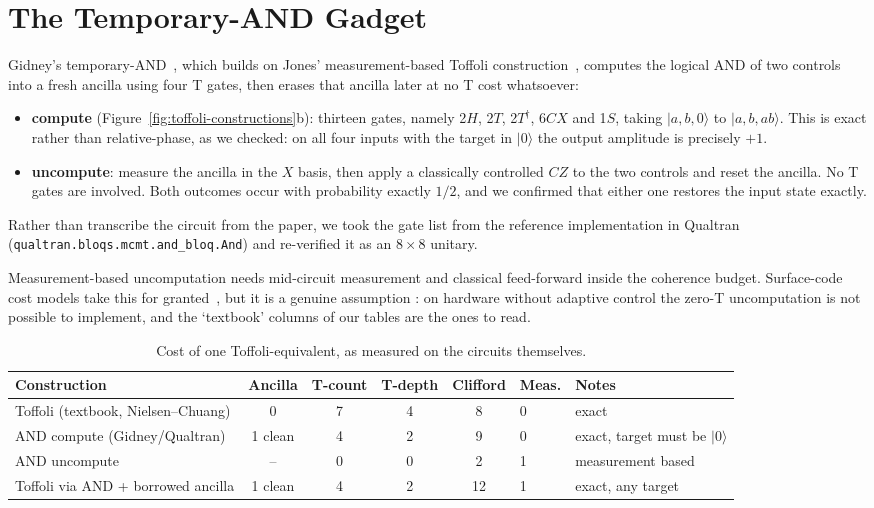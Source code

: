 \documentclass[runningheads,10pt]{llncs}
\begin{document}
\section{The Temporary-AND Gadget}
\label{sec:temp-and}

Gidney's temporary-AND~\cite{gidney2018halving}, which builds on Jones' measurement-based Toffoli construction~\cite{jones2013lowoverhead}, computes the logical AND of two controls into a fresh ancilla using four T gates, then erases that ancilla later at no T cost whatsoever:

\begin{itemize}
\item \textbf{compute} (Figure~\ref{fig:toffoli-constructions}b): thirteen gates, namely 2$H$, 2$T$, 2$T^\dagger$, 6$CX$ and 1$S$, taking $|a,b,0\rangle$ to $|a,b,ab\rangle$. This is exact rather than relative-phase, as we checked: on all four inputs with the target in $|0\rangle$ the output amplitude is precisely $+1$.
\item \textbf{uncompute}: measure the ancilla in the $X$ basis, then apply a classically controlled $CZ$ to the two controls and reset the ancilla. No T gates are involved. Both outcomes occur with probability exactly $1/2$, and we confirmed that either one restores the input state exactly.
\end{itemize}

Rather than transcribe the circuit from the paper, we took the gate list from the reference implementation in Qualtran~\cite{harrigan2024expressing} (\texttt{qualtran.bloqs.mcmt.and\_bloq.And}) and re-verified it as an $8\times8$ unitary.

\begin{remark}
Measurement-based uncomputation needs mid-circuit measurement and classical feed-forward inside the coherence budget. Surface-code cost models take this for granted~\cite{gidney2018halving,jaques2020implementing}, but it is a genuine assumption : on hardware without adaptive control the zero-T uncomputation is not possible to implement, and the `textbook' columns of our tables are the ones to read.
\end{remark}

\begin{table}[htbp]
\centering
\caption{Cost of one Toffoli-equivalent, as measured on the circuits themselves.}
\label{tab:toffoli-cost}
\small
\begin{tabular}{lccccll}
\toprule
Construction & Ancilla & T-count & T-depth & Clifford & Meas. & Notes \\
\midrule
Toffoli (textbook, Nielsen--Chuang) & 0 & 7 & 4 & 8 & 0 & exact \\
AND compute (Gidney/Qualtran) & 1 clean & 4 & 2 & 9 & 0 & exact, target must be $|0\rangle$ \\
AND uncompute & -- & 0 & 0 & 2 & 1 & measurement based \\
Toffoli via AND + borrowed ancilla & 1 clean & 4 & 2 & 12 & 1 & exact, any target \\
\bottomrule
\end{tabular}
\end{table}
\end{document}

